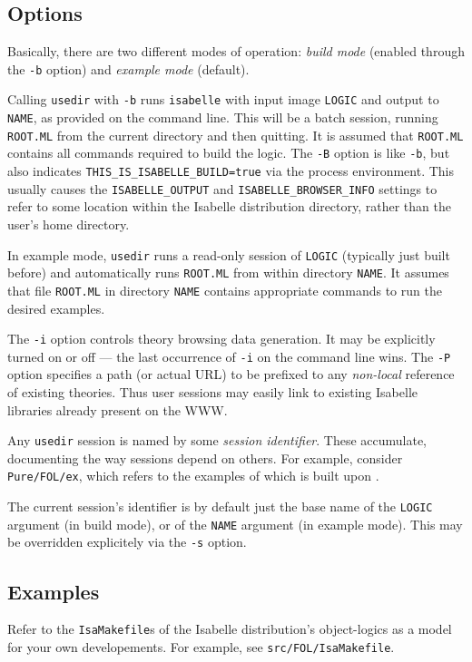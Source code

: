 \subsection*{Options}

Basically, there are two different modes of operation: \emph{build
  mode} (enabled through the \texttt{-b} option) and \emph{example
  mode} (default).

Calling \texttt{usedir} with \texttt{-b} runs \texttt{isabelle} with input
image \texttt{LOGIC} and output to \texttt{NAME}, as provided on the command
line. This will be a batch session, running \texttt{ROOT.ML} from the current
directory and then quitting.  It is assumed that \texttt{ROOT.ML} contains all
{\ML} commands required to build the logic.  The \texttt{-B} option is like
\texttt{-b}, but also indicates \texttt{THIS_IS_ISABELLE_BUILD=true} via the
process environment.  This usually causes the \texttt{ISABELLE\_OUTPUT} and
\texttt{ISABELLE_BROWSER_INFO} settings to refer to some location within the
Isabelle distribution directory, rather than the user's home directory.

In example mode, \texttt{usedir} runs a read-only session of \texttt{LOGIC}
(typically just built before) and automatically runs \texttt{ROOT.ML} from
within directory \texttt{NAME}.  It assumes that file \texttt{ROOT.ML} in
directory \texttt{NAME} contains appropriate {\ML} commands to run the desired
examples.

\medskip The \texttt{-i} option controls theory browsing data generation. It
may be explicitly turned on or off --- the last occurrence of \texttt{-i} on
the command line wins.  The \texttt{-P} option specifies a path (or actual
URL) to be prefixed to any \emph{non-local} reference of existing theories.
Thus user sessions may easily link to existing Isabelle libraries already
present on the WWW.

\medskip Any \texttt{usedir} session is named by some \emph{session
  identifier}. These accumulate, documenting the way sessions depend
on others. For example, consider \texttt{Pure/FOL/ex}, which refers to
the examples of {\FOL} which is built upon {\Pure}.

The current session's identifier is by default just the base name of
the \texttt{LOGIC} argument (in build mode), or of the \texttt{NAME}
argument (in example mode). This may be overridden explicitely via the
\texttt{-s} option.


\subsection*{Examples}

Refer to the \texttt{IsaMakefile}s of the Isabelle distribution's
object-logics as a model for your own developements.  For example, see
\texttt{src/FOL/IsaMakefile}.


